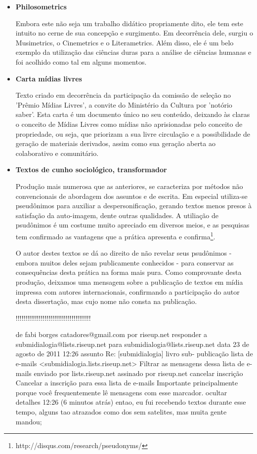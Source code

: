 \begin{itemize}
    \item {\bf Philosometrics}

Embora este não seja um trabalho didático propriamente dito, ele tem este intuito
no cerne de sua concepção e surgimento. Em decorrência dele, surgiu o  Musimetrics,
o Cinemetrics e o Literametrics. Além disso, ele é um belo exemplo da
utilização das ciências duras para a análise de ciências humanas e foi acolhido
como tal em alguns momentos.

    \item {\bf Carta mídias livres}

Texto criado em decorrência da participação da comissão de seleção no
'Prêmio Mídias Livres', a convite do Ministério da Cultura por 'notório saber'.
Esta carta é um documento único no seu conteúdo, deixando às claras
o conceito de Mídias Livres como mídias não aprisionadas pelo conceito
de propriedade, ou seja, que priorizam a sua livre circulação e a possibilidade
de geração de materiais derivados, assim como sua geração aberta ao colaborativo e comunitário.

    \item {\bf Textos de cunho sociológico, transformador}

Produção mais numerosa que as anteriores, se caracteriza por métodos não convencionais
de abordagem dos assuntos e de escrita. Em especial utiliza-se pseudônimos para
auxiliar a despersonificação, gerando textos menos presos à satisfação da auto-imagem, dente
outras qualidades. A utiliação de psudônimos é um costume muito apreciado em diversos meios,
e as pesquisas tem confirmado as vantagens que a prática apresenta e confirma\footnote{http://disqus.com/research/pseudonyms/}.

O autor destes textos se dá ao direito de não revelar seus psudônimos - embora muitos deles
sejam publicamente conhecidos - para conservar as consequências desta prática na
forma mais pura. Como comprovante desta produção, deixamos uma mensagem sobre a publicação
de textos em mídia impressa com autores internacionais,
confirmando a participação do autor desta dissertação, mas cujo
nome não consta na publicação.

!!!!!!!!!!!!!!!!!!!!!!!!!!!!!!!!!!!!!!!

de      fabi borges catadores@gmail.com por  riseup.net 
responder a     submidialogia@lists.riseup.net
para    submidialogia@lists.riseup.net
data    23 de agosto de 2011 12:26
assunto Re: [submidialogia] livro sub- publicação
lista de e-mails        <submidialogia.lists.riseup.net> Filtrar as mensagens dessa lista de e-mails
enviado por     lists.riseup.net
assinado por    riseup.net
cancelar inscrição      Cancelar a inscrição para essa lista de e-mails
        Importante principalmente porque você frequentemente lê mensagens com esse marcador.
ocultar detalhes 12:26 (6 minutos atrás)
entao, eu fui recebendo textos durante esse tempo,
alguns tao atrazados como dos sem satelites, mas muita gente mandou;


\end{itemize}
